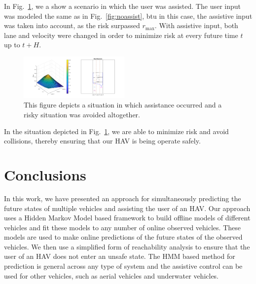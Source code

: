 \documentclass[letterpaper, 10 pt, conference]{ieeeconf}  %
\begin{document}
In Fig.~\ref{fig:assist}, we a show a scenario in which the user was assisted. The user input was modeled the same as in Fig.~\ref{fig:noassist}, btu in this case, the assistive input was taken into account, as the risk surpassed $r_\max$. With assistive input, both lane and velocity were changed in order to minimize risk at every future time $t$ up to $t+H$.

\begin{figure}[ht]
    \includegraphics[width=0.48\textwidth]{assist.png}
    \caption{This figure depicts a situation in which assistance occurred and a risky situation was avoided altogether.}
    \label{fig:assist}
\end{figure}

 In the situation depicted in Fig.~\ref{fig:assist}, we are able to minimize risk and avoid collisions, thereby ensuring that our HAV is being operate safely.


\section{Conclusions} \label{sec:concs}
In this work, we have presented an approach for simultaneously predicting the future states of multiple vehicles and assisting the user of an HAV. Our approach uses a Hidden Markov Model based framework to build offline models of different vehicles and fit these models to any number of online observed vehicles. These models are used to make online predictions of the future states of the observed vehicles. We then use a simplified form of reachability analysis to ensure that the user of an HAV does not enter an unsafe state. The HMM based method for prediction is general across any type of system and the assistive control can be used for other vehicles, such as aerial vehicles and underwater vehicles.


%
%
%
\end{document}

